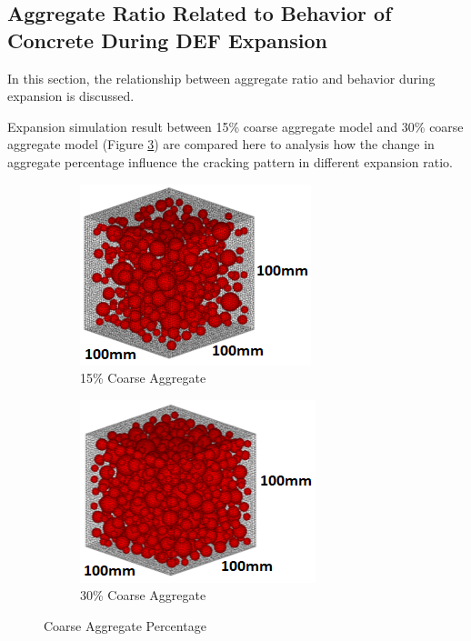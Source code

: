 \clearpage
\subsection{Aggregate Ratio Related to Behavior of Concrete During DEF Expansion}
In this section, the relationship between aggregate ratio and behavior during expansion is discussed.

Expansion simulation result between 15\% coarse aggregate model and 30\% coarse aggregate model (Figure \ref{fig:Aggregate_Percedfsdfntage}) are compared here to analysis how the change in aggregate percentage influence the cracking pattern in different expansion ratio.

\begin{figure}[!h]
\centering
\begin{subfigure}{.5\textwidth}
  \centering
  \includegraphics[width=.8\linewidth]{Files/Aggregate/A15.png}
  \caption{15\% Coarse Aggregate}
  \label{fig:A15_model}
\end{subfigure}%
\begin{subfigure}{.5\textwidth}
  \centering
  \includegraphics[width=.8\linewidth]{Files/Aggregate/A30.png}
  \caption{30\% Coarse Aggregate}
  \label{fig:A15_model}
\end{subfigure}
\caption{Coarse Aggregate Percentage}
\label{fig:Aggregate_Percedfsdfntage}
\end{figure}



